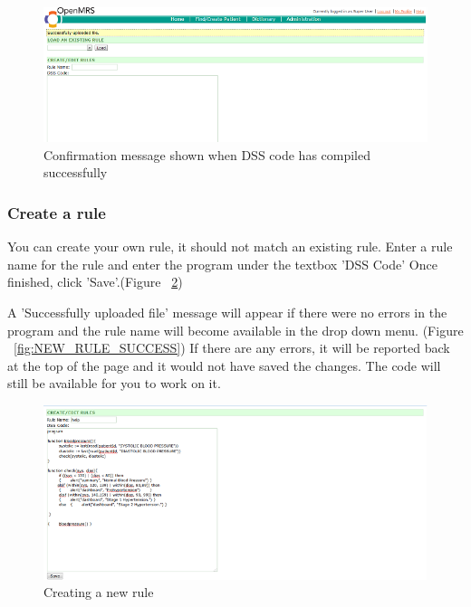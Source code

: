 \documentclass[12pt,letterpaper]{article}
\begin{document}
\begin{figure}\begin{center}
\includegraphics[width=6.5in]{user_guide/modify_success.png}
\end{center}
\caption{Confirmation message shown when DSS code has compiled successfully}
\label{fig:MODIFY_SUCCESS}
\end{figure}

\subsubsection{Create a rule}
You can create your own rule, it should not match an existing rule. Enter a rule name for the rule and enter the program under the textbox 'DSS Code' Once finished, click 'Save'.(Figure ~\ref{fig:NEW_RULE})

A 'Successfully uploaded file' message will appear if there were no errors in the program and the rule name will become available in the drop down menu. 
(Figure ~\ref{fig:NEW_RULE_SUCCESS})
If there are any errors, it will be reported back at the top of the page and it would not have saved the changes. The code will still be available for you to work on it.

\begin{figure}\begin{center}
\includegraphics[width=6.5in]{user_guide/new_rule.png}
\end{center}
\caption{Creating a new rule}
\label{fig:NEW_RULE}
\end{figure}
\end{document}
